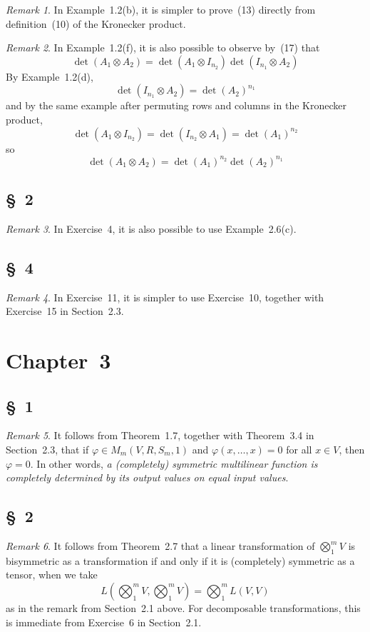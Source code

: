 \documentclass[letterpaper,12pt]{article}
\newcommand{\tprod}{\otimes}
\newcommand{\bigtprod}{\bigotimes}
\newcommand{\medtprod}{{\textstyle\bigtprod}}
\theoremstyle{definition}
\theoremstyle{remark}
\newtheorem*{rmk}{Remark}
\begin{document}
\begin{rmk}
In Example~1.2(b), it is simpler to prove~(13) directly from definition~(10) of the Kronecker product.
\end{rmk}

\begin{rmk}
In Example~1.2(f), it is also possible to observe by~(17) that
\[\det(A_1\tprod A_2)=\det(A_1\tprod I_{n_2})\det(I_{n_1}\tprod A_2)\]
By Example~1.2(d),
\[\det(I_{n_1}\tprod A_2)=\det(A_2)^{n_1}\]
and by the same example after permuting rows and columns in the Kronecker product,
\[\det(A_1\tprod I_{n_2})=\det(I_{n_2}\tprod A_1)=\det(A_1)^{n_2}\]
so
\[\det(A_1\tprod A_2)=\det(A_1)^{n_2}\det(A_2)^{n_1}\]
\end{rmk}

\subsection*{\S~2}
\begin{rmk}
In Exercise~4, it is also possible to use Example~2.6(c).
\end{rmk}

\subsection*{\S~4}
\begin{rmk}
In Exercise~11, it is simpler to use Exercise~10, together with Exercise~15 in Section~2.3.
\end{rmk}

\newpage
\section*{Chapter~3}
\subsection*{\S~1}
\begin{rmk}
It follows from Theorem~1.7, together with Theorem~3.4 in Section~2.3, that if \(\varphi\in M_m(V,R,S_m,1)\) and \(\varphi(x,\ldots,x)=0\) for all \(x\in V\), then \(\varphi=0\). In other words, \emph{a (completely) symmetric multilinear function is completely determined by its output values on equal input values}.
\end{rmk}

\subsection*{\S~2}
\begin{rmk}
It follows from Theorem~2.7 that a linear transformation of \(\medtprod_1^m V\) is bisymmetric as a transformation if and only if it is (completely) symmetric as a tensor, when we take
\[L(\medtprod_1^m V,\medtprod_1^m V)=\medtprod_1^m L(V,V)\]
as in the remark from Section~2.1 above. For decomposable transformations, this is immediate from Exercise~6 in Section~2.1.
\end{rmk}
\end{document}
